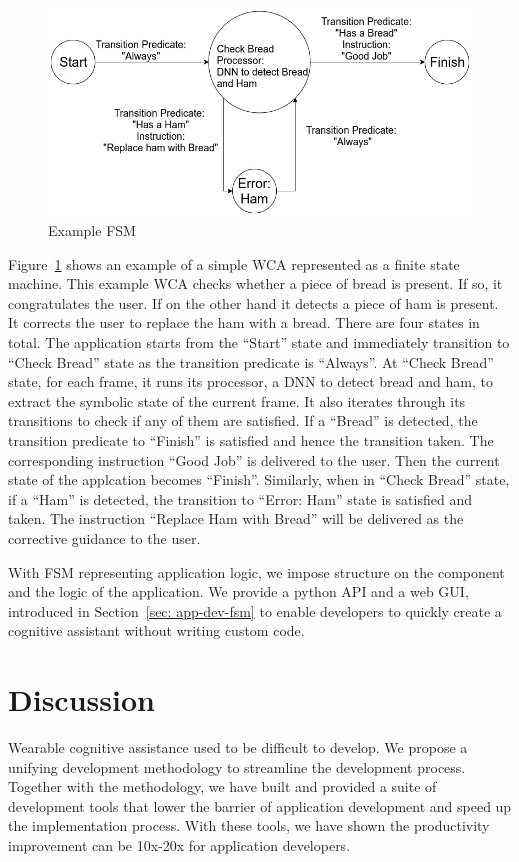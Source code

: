 \begin{figure}
  \centering
  \includegraphics[trim={0 0 0 0},width=\linewidth]{FIGS/fsm-example}
	\caption{Example FSM}
    \label{figs:fsm-example}
\end{figure}

Figure~\ref{figs:fsm-example} shows an example of a simple WCA represented as a
finite state machine. This example WCA checks whether a piece of bread is
present. If so, it congratulates the user. If on the other hand it detects a
piece of ham is present. It corrects the user to replace the ham with a bread.
There are four states in total. The application starts from the ``Start'' state
and immediately transition to ``Check Bread'' state as the transition predicate
is ``Always''. At ``Check Bread'' state, for each frame, it runs its processor,
a DNN to detect bread and ham, to extract the symbolic state of the current
frame. It also iterates through its transitions to check if any of them are
satisfied. If a ``Bread'' is detected, the transition predicate to ``Finish'' is
satisfied and hence the transition taken. The corresponding instruction ``Good
Job'' is delivered to the user. Then the current state of the applcation becomes
``Finish''. Similarly, when in ``Check Bread'' state, if a ``Ham'' is detected,
the transition to ``Error: Ham'' state is satisfied and taken. The instruction
``Replace Ham with Bread'' will be delivered as the corrective guidance to the
user.

With FSM representing application logic, we impose structure on the component
and the logic of the application. We provide a python API and a web GUI,
introduced in Section~\ref{sec: app-dev-fsm} to enable developers to
quickly create a cognitive assistant without writing custom code. 




\section{Discussion}

Wearable cognitive assistance used to be difficult to develop. We propose a
unifying development methodology to streamline the development process. Together
with the methodology, we have built and provided a suite of development tools
that lower the barrier of application development and speed up the
implementation process. With these tools, we have shown the productivity
improvement can be 10x-20x for application developers.